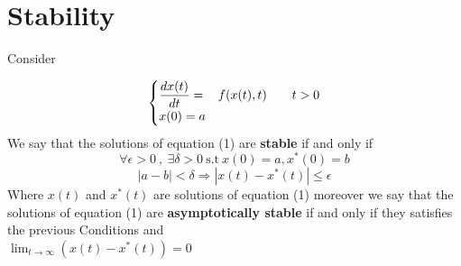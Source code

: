 \documentclass[]{article}
\begin{document}
\section{Stability}

Consider

\begin{equation}
    \begin{cases}
        \displaystyle \frac{dx(t)}{dt} = & f(x(t),t) \quad\quad t>0
        \\
        x(0) = a
    \end{cases}
\end{equation}
We say that the solutions of equation (1) are \textbf{stable} if and only if
\[
    \forall \epsilon >0 \  , \ \exists \delta >0 \ \text{s.t} \  x(0)=a , x^*(0)=b
\]\[
    \left\lvert a-b \right\rvert < \delta \Longrightarrow
    \left\lvert x(t) - x^*(t) \right\rvert \leq \epsilon
\]
Where $x(t)$ and $x^*(t)$ are solutions of equation (1) moreover we
say that the solutions of equation (1) are \textbf{asymptotically stable} if and only if they
satisfies the previous Conditions and \\
$\displaystyle \lim_{t \to \infty} (x(t) - x^*(t)) = 0$
\end{document}
